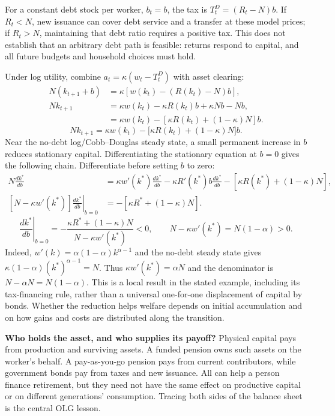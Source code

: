 For a constant debt stock per worker, $b_t=b$, the tax is
$T_t^D=(R_t-N)b$. If $R_t<N$, new issuance can cover debt service and a
transfer at these model prices; if $R_t>N$, maintaining that debt ratio
requires a positive tax. This does not establish that an arbitrary debt
path is feasible: returns respond to capital, and all future budgets and
household choices must hold.

Under log utility, combine $a_t=\kappa(w_t-T_t^D)$ with asset clearing:
\begin{align}
N(k_{t+1}+b)&=\kappa[w(k_t)-(R(k_t)-N)b],\\
Nk_{t+1}&=\kappa w(k_t)-\kappa R(k_t)b+\kappa Nb-Nb,\\
 &=\kappa w(k_t)-[\kappa R(k_t)+(1-\kappa)N]b.
\end{align}
\begin{equation}
Nk_{t+1}=\kappa w(k_t)
-\big[\kappa R(k_t)+(1-\kappa)N\big]b.
\end{equation}
Near the no-debt log/Cobb--Douglas steady state, a small permanent increase
in $b$ reduces stationary capital. Differentiating the stationary equation
at $b=0$ gives
the following chain. Differentiate before setting $b$ to zero:
\begin{align}
N\frac{dk^*}{db}
 &=\kappa w'(k^*)\frac{dk^*}{db}
   -\kappa R'(k^*)b\frac{dk^*}{db}
   -[\kappa R(k^*)+(1-\kappa)N],\\
\left[N-\kappa w'(k^*)\right]
 \left.\frac{dk^*}{db}\right|_{b=0}
 &=-[\kappa R^*+(1-\kappa)N].
\end{align}
\begin{equation}
\left.\frac{dk^*}{db}\right|_{b=0}
=-\frac{\kappa R^*+(1-\kappa)N}{N-\kappa w'(k^*)}<0,
\qquad N-\kappa w'(k^*)=N(1-\alpha)>0.
\end{equation}
Indeed, $w'(k)=\alpha(1-\alpha)k^{\alpha-1}$ and the no-debt steady
state gives $\kappa(1-\alpha)(k^*)^{\alpha-1}=N$.
Thus $\kappa w'(k^*)=\alpha N$ and the denominator is
$N-\alpha N=N(1-\alpha)$.
This is a local result in the stated example, including its tax-financing
rule, rather than a universal one-for-one displacement of capital by bonds.
Whether the reduction helps welfare depends on initial accumulation and
on how gains and costs are distributed along the transition.

\begin{greenblock}
\textbf{Who holds the asset, and who supplies its payoff?}
Physical capital pays from production and surviving assets. A funded pension
owns such assets on the worker's behalf. A pay-as-you-go pension pays from
current contributors, while government bonds pay from taxes and new issuance.
All can help a person finance retirement, but they need not have the same
effect on productive capital or on different generations' consumption.
Tracing both sides of the balance sheet is the central OLG lesson.
\end{greenblock}

